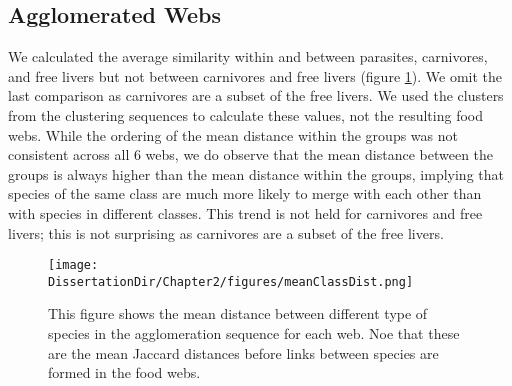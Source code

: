 \documentclass[/home/nkappler/Research/Dissertation/dissertation.tex]{subfiles}
\begin{document}
\begin{bibunit}
\begin{sidewaysfigure}
    \caption[Community properties of free livers and parasites]%
        {This figure shows the average value among parasites ($y$-axis) and
        carnivores ($x$-axis) for each property and each web. Dot size is
        proportional to the species abundance and colored according to the
        connectance of the corresponding web.  The average among the 6 webs for
        free-livers is denoted by the vertical line and for parasites by the
        horizontal line. The vertical and horizontal lines are colored red if
        the mean difference between the free-liver and parasitic value in each
        web is significantly different from zero. We performed two sided
        $t$-tests and controlled the family-wise error rate at $\alpha=0.05$
        using the Bonferroni-Holm procedure. We also report the corresponding
        $t$ statistics and $P$-values for the hypothesis tests. The diagonal
        line represents equality between free-livers and
        parasites.\label{fig:initialNodalProperties}}
\end{sidewaysfigure}

\subsection{Agglomerated Webs}

We calculated the average similarity within and between parasites, carnivores,
and free livers but not between carnivores and free livers (figure
\ref{fig:meanDistFig}). We omit the last comparison as carnivores are a subset
of the free livers. We used the clusters from the clustering sequences to
calculate these values, not the resulting food webs. While the ordering of the
mean distance within the groups was not consistent across all 6 webs, we do
observe that the mean distance between the groups is always higher than the
mean distance within the groups, implying that species of the same class are much more
likely to merge with each other than with species in different classes. This
trend is not held for carnivores and free livers; this is not surprising as
carnivores are a subset of the free livers.

\begin{figure}
    {%
    }%
    \texttt{[image: \\DissertationDir/Chapter2/figures/meanClassDist.png]}
    \caption[Mean distances of species community clusters]%
        {This figure shows the mean distance between different type of
        species in the agglomeration sequence for each web. Noe that these
        are the mean Jaccard distances before links between species are formed
        in the food webs.
    \label{fig:meanDistFig}}


\end{figure}
\end{bibunit}
\end{document}
